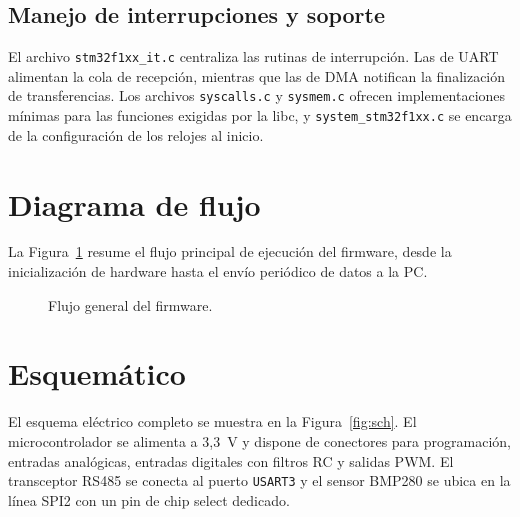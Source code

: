 \documentclass{article}
\begin{document}
\subsection{Manejo de interrupciones y soporte}
El archivo \texttt{stm32f1xx\_it.c} centraliza las rutinas de interrupción. Las de UART alimentan la cola de recepción, mientras que las de DMA notifican la finalización de transferencias. Los archivos \texttt{syscalls.c} y \texttt{sysmem.c} ofrecen implementaciones mínimas para las funciones exigidas por la libc, y \texttt{system\_stm32f1xx.c} se encarga de la configuración de los relojes al inicio.

\section{Diagrama de flujo}
La Figura~\ref{fig:flow} resume el flujo principal de ejecución del firmware, desde la inicialización de hardware hasta el envío periódico de datos a la PC.

\begin{figure}[h!]
\centering
{}
\caption{Flujo general del firmware.}
\label{fig:flow}
\end{figure}

\section{Esquemático}
El esquema eléctrico completo se muestra en la Figura~\ref{fig:sch}. El microcontrolador se alimenta a 3{,}3~V y dispone de conectores para programación, entradas analógicas, entradas digitales con filtros RC y salidas PWM. El transceptor RS485 se conecta al puerto \texttt{USART3} y el sensor BMP280 se ubica en la línea SPI2 con un pin de chip select dedicado.
\end{document}
